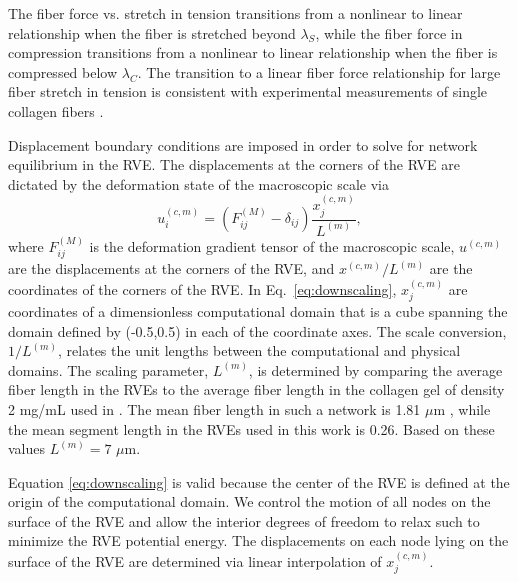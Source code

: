 \documentclass[]{interact}
\begin{document}
The fiber force vs. stretch in tension transitions from a nonlinear to linear relationship when the fiber is stretched beyond $\lambda_S$, while the fiber force in compression transitions from a nonlinear to linear relationship when the fiber is compressed below $\lambda_C$. The transition to a linear fiber force relationship for large fiber stretch in tension is consistent with experimental measurements of single collagen fibers \citep{Eppell:2006hh,Svensson:2010fr}. 

Displacement boundary conditions are imposed in order to solve for network equilibrium in the RVE. The displacements at the corners of the RVE are dictated by the deformation state of the macroscopic scale via
%
\begin{equation}
u^{(c,m)}_i = (F^{(M)}_{ij} - \delta_{ij}) \frac{x^{(c,m)}_j}{L^{(m)}},
\label{eq:downscaling}
\end{equation}
%
where $F^{(M)}_{ij}$ is the deformation gradient tensor of the macroscopic scale, $u^{(c,m)}$ are the displacements at the corners of the RVE,  and $x^{(c,m)}/L^{(m)}$ are the coordinates of the corners of the RVE. In Eq.\ \eqref{eq:downscaling}, $x^{(c,m)}_j$ are coordinates of a dimensionless computational domain that is a cube spanning the domain defined by (-0.5,0.5) in each of the coordinate axes. The scale conversion, $1/L^{(m)}$, relates the unit lengths between the computational and physical domains. The scaling parameter, $L^{(m)}$, is determined by comparing the average fiber length in the RVEs to the average fiber length in the collagen gel of density 2 mg/mL used in \citep{Zhang:2016ga}. The mean fiber length in such a network is 1.81 $\mu$m \citep{Lindstrom:2013gd}, while the mean segment length in the RVEs used in this work is 0.26. Based on these values $L^{(m)} = 7$ $\mu$m.

Equation \eqref{eq:downscaling} is valid because the center of the RVE is defined at the origin of the computational domain. We control the motion of all nodes on the surface of the RVE and allow the interior degrees of freedom to relax such to minimize the RVE potential energy. The displacements on each node lying on the surface of the RVE are determined via linear interpolation of $x^{(c,m)}_j$. 
\end{document}

